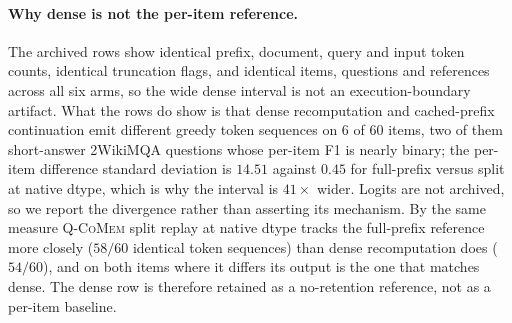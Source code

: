 \documentclass{article}
\newcommand{\qcomem}{\textsc{Q-CoMem}}
\begin{document}
\paragraph{Why dense is not the per-item reference.}
The archived rows show identical prefix, document, query and input token
counts, identical truncation flags, and identical items, questions and
references across all six arms, so the wide dense interval is not an
execution-boundary artifact.  What the rows do show is that dense
recomputation and cached-prefix continuation emit different greedy token
sequences on 6 of 60 items, two of them short-answer 2WikiMQA questions whose
per-item F1 is nearly binary; the per-item difference standard deviation is
$14.51$ against $0.45$ for full-prefix versus split at native dtype, which is why the
interval is $41\times$ wider.  Logits are not archived, so we report the
divergence rather than asserting its mechanism.  By the same measure
\qcomem{} split replay at native dtype tracks the full-prefix reference more closely ($58/60$ identical
token sequences) than dense recomputation does ($54/60$), and on both items
where it differs its output is the one that matches dense.  The dense row is
therefore retained as a no-retention reference, not as a per-item baseline.
\end{document}
